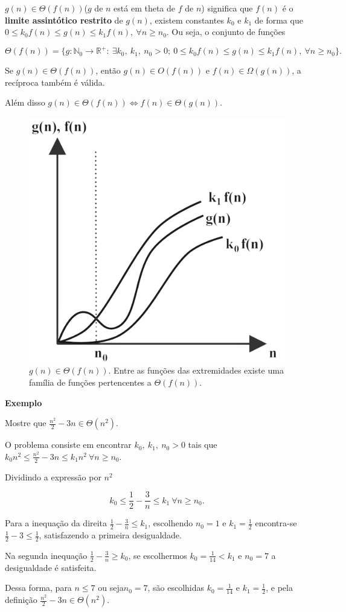 $g(n)\in\Theta(f(n))$($g$ de $n$ está em theta de $f$ de $n$) significa que $f(n)$ é o \textbf{limite assintótico restrito} de $g(n)$, existem constantes $k_0$ e $k_1$ de forma que $0\leq k_0f(n) \leq g(n) \leq k_1f(n), \ \forall n\geq n_0$. Ou seja, o conjunto de funções

\[\Theta(f(n))=\{g: \mathbb{N}_0 \rightarrow \mathbb{R}^{+}: \ \exists k_0, \ k_1, \ n_0 > 0; \ 0\leq k_0f(n) \leq g(n) \leq k_1f(n), \ \forall n \geq n_0 \}.\]

Se $g(n)\in\Theta(f(n))$, então $g(n)\in O(f(n))$ e $f(n)\in\Omega(g(n))$, a recíproca também é válida.

Além disso $g(n)\in\Theta(f(n)) \Leftrightarrow f(n)\in\Theta(g(n))$.

\begin{figure}
  \centering
  \includegraphics[width=0.4\linewidth]{img/Theta.png}
    \caption{$g(n)\in\Theta(f(n))$. Entre as funções das extremidades existe uma família de funções pertencentes a $\Theta(f(n))$.}
    \label{Theta}
\end{figure}

\textbf{Exemplo}

Mostre que $\frac{n^2}{2}-3n \in \Theta(n^2)$.

O problema consiste em encontrar $k_0, \ k_1, \ n_0 > 0$ tais que $k_0n^2\leq \frac{n^2}{2}-3n\leq k_1n^2 \ \forall n\geq n_0$.

Dividindo a expressão por $n^2$

\[k_0\leq \frac{1}{2} - \frac{3}{n} \leq k_1 \ \forall n\geq n_0.\]

Para a inequação da direita $\frac{1}{2}-\frac{3}{n}\leq k_1$, escolhendo $n_0=1$ e $k_1=\frac{1}{2}$ encontra-se $\frac{1}{2} -3 \leq \frac{1}{2}$, satisfazendo a primeira desigualdade.

Na segunda inequação $\frac{1}{2}-\frac{3}{n}\geq k_0$, se escolhermos $k_0=\frac{1}{14} < k_1$ e $n_0=7$ a desigualdade é satisfeita.

Dessa forma, para $n\leq 7$ ou seja$n_0=7$, são escolhidas $k_0=\frac{1}{14}$ e $k_1=\frac{1}{2}$, e pela definição $\frac{n^2}{2}-3n\in\Theta(n^2)$.

